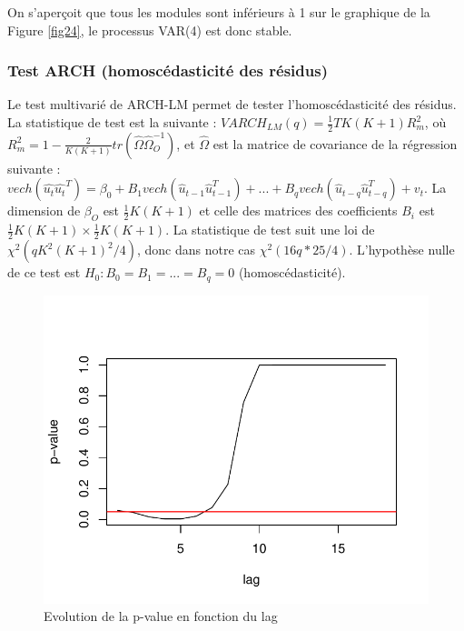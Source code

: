 \documentclass[11pt,]{article}
\begin{document}
On s'aperçoit que tous les modules sont inférieurs à 1 sur le graphique
de la Figure \ref{fig24}, le processus VAR(4) est donc stable.

\subsubsection{Test ARCH (homoscédasticité des
résidus)}\label{test-arch-homoscedasticite-des-residus}

Le test multivarié de ARCH-LM permet de tester l'homoscédasticité des
résidus. La statistique de test est la suivante :
\(VARCH_{LM}(q) = \frac{1}{2}TK(K+1)R_m^2\), où
\(R_m^2 = 1 - \frac{2}{K(K+1)}tr(\hat{\Omega}\hat{\Omega}_O^{-1})\), et
\(\hat{\Omega}\) est la matrice de covariance de la régression suivante
:
\(vech(\hat{u_t}\hat{u_t}^T) = \beta_0 + B_1 vech(\hat{u}_{t-1}\hat{u}_{t-1}^T) + ... + B_q vech(\hat{u}_{t-q}\hat{u}_{t-q}^T) + v_t\).
La dimension de \(\beta_O\) est \(\frac{1}{2}K(K+1)\) et celle des
matrices des coefficients \(B_i\) est
\(\frac{1}{2}K(K+1) × \frac{1}{2}K(K+1)\). La statistique de test suit
une loi de \(\chi^2(qK^2(K+1)^2/4)\), donc dans notre cas
\(\chi^2(16q*25/4)\). L'hypothèse nulle de ce test est
\(H_0 : B_0 = B_1 = ... = B_q = 0\) (homoscédasticité).

\begin{figure}[htbp]
\centering
\includegraphics{doc_files/figure-latex/unnamed-chunk-39-1.pdf}
\caption{\label{fig25} Evolution de la p-value en fonction du lag}
\end{figure}
\end{document}
